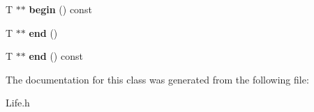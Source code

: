 \begin{DoxyCompactItemize}
\item 
\hypertarget{classLife_aed86fa5bbb55e45bf7723aad63949efc}{T $\ast$$\ast$ {\bfseries begin} () const }\label{classLife_aed86fa5bbb55e45bf7723aad63949efc}

\item 
\hypertarget{classLife_ae597f61db6246f7e1e04a1f51a0c39fe}{T $\ast$$\ast$ {\bfseries end} ()}\label{classLife_ae597f61db6246f7e1e04a1f51a0c39fe}

\item 
\hypertarget{classLife_a6abb69bbd7bbc24f7ea4e1f2a8d7f008}{T $\ast$$\ast$ {\bfseries end} () const }\label{classLife_a6abb69bbd7bbc24f7ea4e1f2a8d7f008}

\end{DoxyCompactItemize}


The documentation for this class was generated from the following file\-:\begin{DoxyCompactItemize}
\item 
Life.\-h\end{DoxyCompactItemize}
